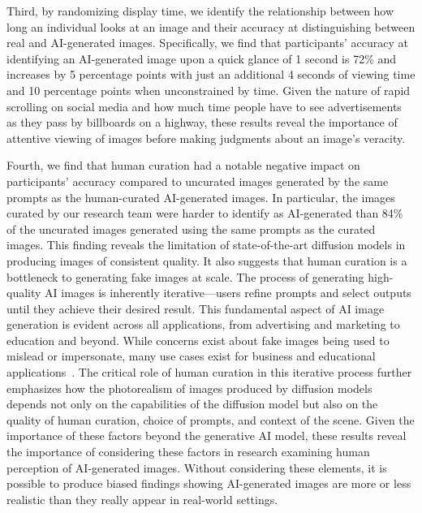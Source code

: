 Third, by randomizing display time, we identify the relationship between how long an individual looks at an image and their accuracy at distinguishing between real and AI-generated images. Specifically, we find that participants' accuracy at identifying an AI-generated image upon a quick glance of 1 second is 72\% and increases by 5 percentage points with just an additional 4 seconds of viewing time and 10 percentage points when unconstrained by time. Given the nature of rapid scrolling on social media and how much time people have to see advertisements as they pass by billboards on a highway, these results reveal the importance of attentive viewing of images before making judgments about an image's veracity. 


Fourth, we find that human curation had a notable negative impact on participants' accuracy compared to uncurated images generated by the same prompts as the human-curated AI-generated images. In particular, the images curated by our research team were harder to identify as AI-generated than 84\% of the uncurated images generated using the same prompts as the curated images. This finding reveals the limitation of state-of-the-art diffusion models in producing images of consistent quality. It also suggests that human curation is a bottleneck to generating fake images at scale. The process of generating high-quality AI images is inherently iterative---users refine prompts and select outputs until they achieve their desired result. This fundamental aspect of AI image generation is evident across all applications, from advertising and marketing to education and beyond. While concerns exist about fake images being used to mislead or impersonate, many use cases exist for business and educational applications~\cite{vartiainen2023using, hartmann2023power, gvirtz2023text}. The critical role of human curation in this iterative process further emphasizes how the photorealism of images produced by diffusion models depends not only on the capabilities of the diffusion model but also on the quality of human curation, choice of prompts, and context of the scene. Given the importance of these factors beyond the generative AI model, these results reveal the importance of considering these factors in research examining human perception of AI-generated images. Without considering these elements, it is possible to produce biased findings showing AI-generated images are more or less realistic than they really appear in real-world settings. 

